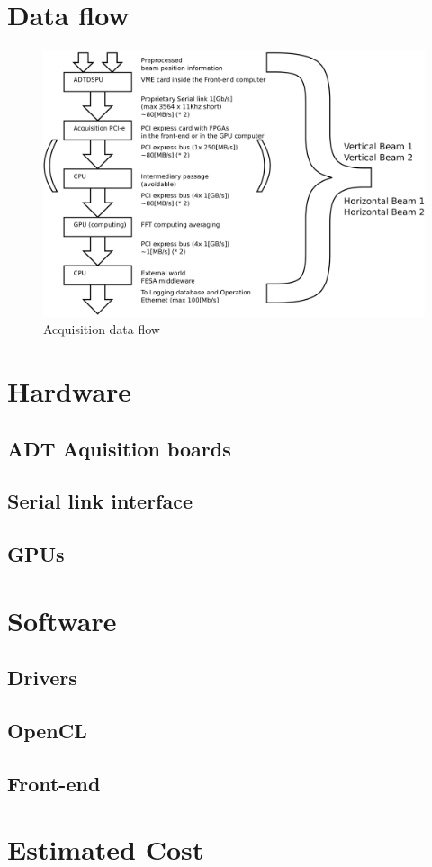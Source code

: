\section{Data flow}

\begin{figure}[H]
\caption{Acquisition data flow}
\label{fig:ramp}
\centering
\includegraphics[scale=0.3]{dataflow.pdf}
\end{figure}

\section{Hardware}

	\subsection{ADT Aquisition boards}

	\subsection{Serial link interface}

	\subsection{GPUs}

\section{Software}

	\subsection{Drivers}

	\subsection{OpenCL}

	\subsection{Front-end}

\section{Estimated Cost}